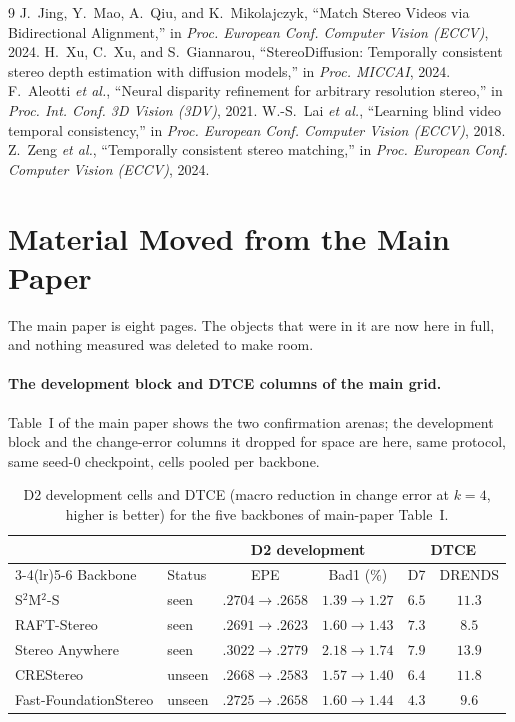 \documentclass[letterpaper,10pt,conference]{ieeeconf}
\begin{document}
\begin{thebibliography}{9}
J.~Jing, Y.~Mao, A.~Qiu, and K.~Mikolajczyk,
``Match Stereo Videos via Bidirectional Alignment,''
in \emph{Proc. European Conf. Computer Vision (ECCV)}, 2024.
H.~Xu, C.~Xu, and S.~Giannarou,
``StereoDiffusion: Temporally consistent stereo depth estimation with diffusion models,''
in \emph{Proc. MICCAI}, 2024.
F.~Aleotti \emph{et al.},
``Neural disparity refinement for arbitrary resolution stereo,''
in \emph{Proc. Int. Conf. 3D Vision (3DV)}, 2021.
W.-S.~Lai \emph{et al.},
``Learning blind video temporal consistency,''
in \emph{Proc. European Conf. Computer Vision (ECCV)}, 2018.
Z.~Zeng \emph{et al.},
``Temporally consistent stereo matching,''
in \emph{Proc. European Conf. Computer Vision (ECCV)}, 2024.
\end{thebibliography}


\section{Material Moved from the Main Paper}

The main paper is eight pages. The objects that were in it are now here in
full, and nothing measured was deleted to make room.

\paragraph{The development block and DTCE columns of the main grid.}
Table~I of the main paper shows the two confirmation arenas; the development
block and the change-error columns it dropped for space are here, same
protocol, same seed-$0$ checkpoint, cells pooled per backbone.

\begin{table}[htb]
\centering
\small
\caption{D2 development cells and DTCE (macro reduction in change error at
$k{=}4$, higher is better) for the five backbones of main-paper Table~I.}
\begin{tabular}{ll|cc|cc}
\toprule
& & \multicolumn{2}{c|}{D2 development} & \multicolumn{2}{c}{DTCE} \\
\cmidrule(lr){3-4}\cmidrule(lr){5-6}
Backbone & Status & EPE & Bad1 (\%) & D7 & DRENDS \\
\midrule
S$^2$M$^2$-S & seen & $.2704\rightarrow\mathbf{.2658}$ & $1.39\rightarrow\mathbf{1.27}$ & $6.5$ & $11.3$ \\
RAFT-Stereo & seen & $.2691\rightarrow\mathbf{.2623}$ & $1.60\rightarrow\mathbf{1.43}$ & $7.3$ & $8.5$ \\
Stereo Anywhere & seen & $.3022\rightarrow\mathbf{.2779}$ & $2.18\rightarrow\mathbf{1.74}$ & $7.9$ & $13.9$ \\
CREStereo & unseen & $.2668\rightarrow\mathbf{.2583}$ & $1.57\rightarrow\mathbf{1.40}$ & $6.4$ & $11.8$ \\
Fast-FoundationStereo & unseen & $.2725\rightarrow\mathbf{.2658}$ & $1.60\rightarrow\mathbf{1.44}$ & $4.3$ & $9.6$ \\
\bottomrule
\end{tabular}
\end{table}
\end{document}
